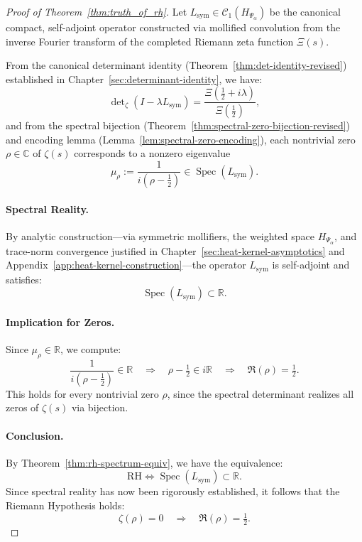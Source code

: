 \begin{proof}[Proof of Theorem~\ref{thm:truth_of_rh}]
Let \( L_{\mathrm{sym}} \in \mathcal{C}_1(H_{\Psi_\alpha}) \) be the canonical compact, self-adjoint operator constructed via mollified convolution from the inverse Fourier transform of the completed Riemann zeta function \( \Xi(s) \).

From the canonical determinant identity (Theorem~\ref{thm:det-identity-revised}) established in Chapter~\ref{sec:determinant-identity}, we have:
\[
\det\nolimits_\zeta(I - \lambda L_{\mathrm{sym}}) = \frac{\Xi\left( \tfrac{1}{2} + i\lambda \right)}{\Xi\left( \tfrac{1}{2} \right)},
\]
and from the spectral bijection (Theorem~\ref{thm:spectral-zero-bijection-revised}) and encoding lemma (Lemma~\ref{lem:spectral-zero-encoding}), each nontrivial zero \( \rho \in \mathbb{C} \) of \( \zeta(s) \) corresponds to a nonzero eigenvalue
\[
\mu_\rho := \frac{1}{i(\rho - \tfrac{1}{2})} \in \operatorname{Spec}(L_{\mathrm{sym}}).
\]

\paragraph{Spectral Reality.}
By analytic construction—via symmetric mollifiers, the weighted space \( H_{\Psi_\alpha} \), and trace-norm convergence justified in Chapter~\ref{sec:heat-kernel-asymptotics} and Appendix~\ref{app:heat-kernel-construction}—the operator \( L_{\mathrm{sym}} \) is self-adjoint and satisfies:
\[
\operatorname{Spec}(L_{\mathrm{sym}}) \subset \mathbb{R}.
\]

\paragraph{Implication for Zeros.}
Since \( \mu_\rho \in \mathbb{R} \), we compute:
\[
\frac{1}{i(\rho - \tfrac{1}{2})} \in \mathbb{R}
\quad \Longrightarrow \quad \rho - \tfrac{1}{2} \in i\mathbb{R}
\quad \Longrightarrow \quad \Re(\rho) = \tfrac{1}{2}.
\]
This holds for every nontrivial zero \( \rho \), since the spectral determinant realizes all zeros of \( \zeta(s) \) via bijection.

\paragraph{Conclusion.}
By Theorem~\ref{thm:rh-spectrum-equiv}, we have the equivalence:
\[
\mathrm{RH} \iff \operatorname{Spec}(L_{\mathrm{sym}}) \subset \mathbb{R}.
\]
Since spectral reality has now been rigorously established, it follows that the Riemann Hypothesis holds:
\[
\zeta(\rho) = 0 \quad \Rightarrow \quad \Re(\rho) = \tfrac{1}{2}.
\]
\end{proof}

